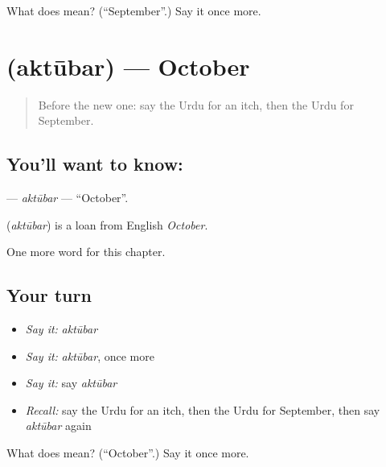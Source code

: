 \begin{tcolorbox}[breakable,colback=teal!4,colframe=teal!35!black,title={Before you move on}]
What does  mean? (\textquotedblleft{}September\textquotedblright{}.) Say it once more.
\end{tcolorbox}
\section[\texorpdfstring{\ur{اکتوبر} (aktūbar)}{اکتوبر (aktūbar)}]{ (aktūbar) — October}

\label{lesson:UR-C218-aktubar}



\begin{quote}
Before the new one: say the Urdu for an itch, then the Urdu for September.
\end{quote}

\subsection*{You'll want to know: }
\textbf{} — \emph{aktūbar} — \textquotedblleft{}October\textquotedblright{}.

\begin{cousinweb}
\textbf{} (\emph{aktūbar}) is a loan from English \emph{October}.
\end{cousinweb}

\begin{grammarlens}[title={What you've built}]
One more word for this chapter.
\end{grammarlens}

\subsection*{Your turn}
\begin{itemize}
\raggedright
  \item \emph{Say it:} \emph{aktūbar}
  \item \emph{Say it:} \emph{aktūbar}, once more
  \item \emph{Say it:} say \emph{aktūbar}
  \item \emph{Recall:} say the Urdu for an itch, then the Urdu for September, then say \emph{aktūbar} again
\end{itemize}

\begin{tcolorbox}[breakable,colback=teal!4,colframe=teal!35!black,title={Before you move on}]
What does  mean? (\textquotedblleft{}October\textquotedblright{}.) Say it once more.
\end{tcolorbox}
